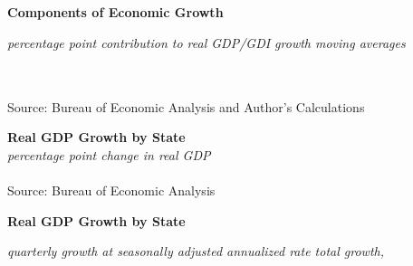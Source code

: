 \documentclass{report}
\begin{document}
\newpage

\noindent \normalsize \textbf{Components of Economic Growth}\\
\footnotesize{\textit{percentage point contribution to real GDP/GDI growth \hspace{30mm} moving averages}\\ \vspace{4mm}
\hspace*{-2mm} \noindent {} \setlength{\tabcolsep}{3.5pt} \color{black!90}
		{\renewcommand{\arraystretch}{1.55}
		 \begin{tabular}{p{2mm} p{35.2mm} R{8.2mm} R{6.8mm} R{6.8mm} R{6.8mm} R{6.8mm} p{0mm} R{6.8mm} R{6.8mm} R{6.8mm} }

		\end{tabular}}	\\
\footnotesize{Source: Bureau of Economic Analysis and Author's Calculations}
		
\newpage

\noindent \normalsize \textbf{Real GDP Growth by State}\\
\footnotesize{\textit{percentage point change in real GDP}}\\
\vspace{-2mm}
\hspace{-8mm}  \\
\footnotesize{Source: Bureau of Economic Analysis}\\

\vspace{2mm}

\begin{minipage}{0.76\textwidth}

\small  
\end{minipage}

\vspace{2mm}

\normalsize \textbf{Real GDP Growth by State}\\
\footnotesize{\textit{quarterly growth at seasonally adjusted annualized rate \hspace{20mm} total growth, }\\ 

\vspace{-4.5mm}
\hspace{-2mm} \noindent {} \setlength{\tabcolsep}{3.7pt} \color{black!90}
		{\renewcommand{\arraystretch}{1.44}
		 \begin{tabular}{p{30mm} R{7mm} R{7mm} R{7mm} R{7mm} R{7mm} p{0mm} R{9mm} R{9mm} R{10mm} }
 \hline
		\end{tabular}}	\\

}}
\end{document}
